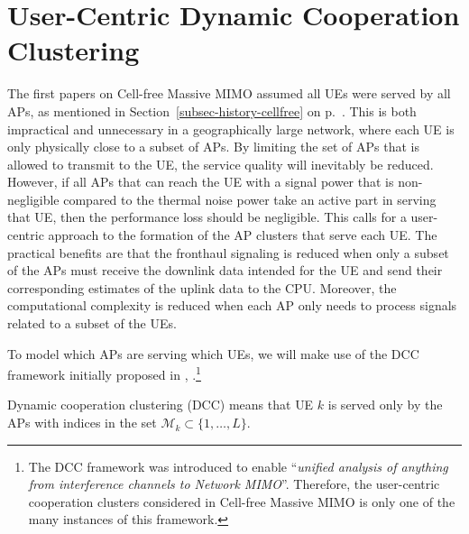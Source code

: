 \section{User-Centric Dynamic Cooperation Clustering}\label{sec:dynamic-clustering}

The first papers on Cell-free Massive MIMO assumed all UEs were served by all APs, as mentioned in Section~\ref{subsec-history-cellfree} on p.~\pageref{subsec-history-cellfree}. This is both impractical and unnecessary in a geographically large network, where each UE is only physically close to a subset of APs. 
By limiting the set of \glspl{AP} that is allowed to transmit to the \gls{UE}, the service quality will inevitably be reduced. However, if all APs that can reach the \gls{UE} with a signal power that is non-negligible compared to the thermal noise power take an active part in serving that \gls{UE}, then the performance loss should be negligible. This calls for a user-centric approach to the formation of the \gls{AP} clusters that serve each \gls{UE}. The practical benefits are that the fronthaul signaling is reduced when only a subset of the \glspl{AP} must receive the downlink data intended for the \gls{UE} and send their corresponding estimates of the uplink data to the \gls{CPU}. Moreover, the computational complexity is reduced when each \gls{AP} only needs to process signals related to a subset of the \glspl{UE}.

To model which \glspl{AP} are serving which \glspl{UE}, we will make use of the \gls{DCC} framework initially proposed in \cite{Bjornson2011a}, \cite{Bjornson2013d}.\footnote{The \gls{DCC} framework was introduced to enable ``\emph{unified analysis of anything from interference channels to Network MIMO}''. Therefore, the user-centric cooperation clusters considered in Cell-free Massive MIMO is only one of the many instances of this framework.}

\begin{definition}\label{definition:DCC}
Dynamic cooperation clustering (DCC) means that \gls{UE} $k$ is served only by the \glspl{AP} with indices in the set $\mathcal{M}_k \subset \{ 1, \ldots, L\}$.
\end{definition}

